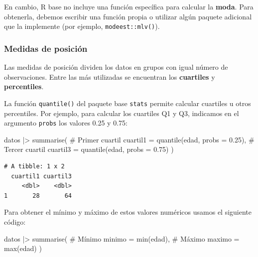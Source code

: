 \documentclass[
  spanish,
  letterpaper,
  DIV=11,
  numbers=noendperiod]{scrreprt}
\newenvironment{Shaded}{\begin{snugshade}}{\end{snugshade}}
\newcommand{\AttributeTok}[1]{\textcolor[rgb]{0.40,0.45,0.13}{#1}}
\newcommand{\CommentTok}[1]{\textcolor[rgb]{0.37,0.37,0.37}{#1}}
\newcommand{\FloatTok}[1]{\textcolor[rgb]{0.68,0.00,0.00}{#1}}
\newcommand{\FunctionTok}[1]{\textcolor[rgb]{0.28,0.35,0.67}{#1}}
\newcommand{\NormalTok}[1]{\textcolor[rgb]{0.00,0.23,0.31}{#1}}
\newcommand{\SpecialCharTok}[1]{\textcolor[rgb]{0.37,0.37,0.37}{#1}}
\begin{document}
En cambio, R base no incluye una función específica para calcular la
\textbf{moda}. Para obtenerla, debemos escribir una función propia o
utilizar algún paquete adicional que la implemente (por ejemplo,
\texttt{modeest::mlv()}).

\subsubsection{Medidas de posición}\label{medidas-de-posiciuxf3n}

Las medidas de posición dividen los datos en grupos con igual número de
observaciones. Entre las más utilizadas se encuentran los
\textbf{cuartiles} y \textbf{percentiles}.

La función \texttt{quantile()} del paquete base \texttt{stats} permite
calcular cuartiles u otros percentiles. Por ejemplo, para calcular los
cuartiles Q1 y Q3, indicamos en el argumento \texttt{probs} los valores
0.25 y 0.75:

\begin{Shaded}
\begin{Highlighting}[]
\NormalTok{datos }\SpecialCharTok{|\textgreater{}}
  \FunctionTok{summarise}\NormalTok{(}
    \CommentTok{\# Primer cuartil}
    \AttributeTok{cuartil1 =} \FunctionTok{quantile}\NormalTok{(edad, }\AttributeTok{probs =} \FloatTok{0.25}\NormalTok{),}
    \CommentTok{\# Tercer cuartil}
    \AttributeTok{cuartil3 =} \FunctionTok{quantile}\NormalTok{(edad, }\AttributeTok{probs =} \FloatTok{0.75}\NormalTok{)}
\NormalTok{  )}
\end{Highlighting}
\end{Shaded}

\begin{verbatim}
# A tibble: 1 x 2
  cuartil1 cuartil3
     <dbl>    <dbl>
1       28       64
\end{verbatim}

Para obtener el mínimo y máximo de estos valores numéricos usamos el
siguiente código:

\begin{Shaded}
\begin{Highlighting}[]
\NormalTok{datos }\SpecialCharTok{|\textgreater{}}
  \FunctionTok{summarise}\NormalTok{(}
    \CommentTok{\# Mínimo}
    \AttributeTok{minimo =} \FunctionTok{min}\NormalTok{(edad),}
    \CommentTok{\# Máximo}
    \AttributeTok{maximo =} \FunctionTok{max}\NormalTok{(edad)}
\NormalTok{  )}
\end{Highlighting}
\end{Shaded}
\end{document}
